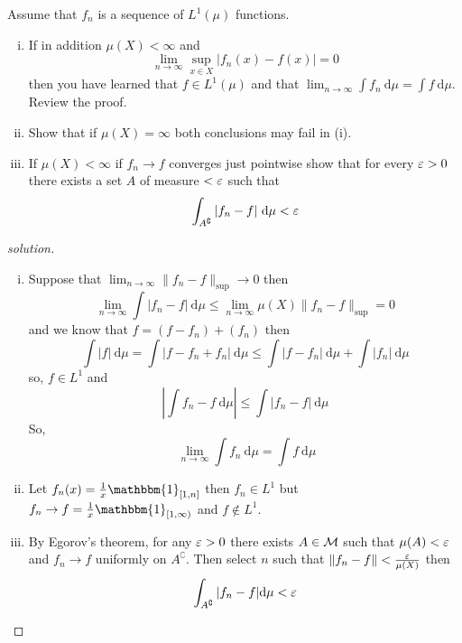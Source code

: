 \begin{problem}
  Assume that $f_n$ is a sequence of $L^1(\mu)$ functions.
  \begin{enumerate}[(i)]
    \item If in addition $\mu(X) < \infty$ and 
    \[\lim_{n\to\infty}\sup_{x \in X} |f_n(x) - f(x)| = 0\]
    then you have learned that $f \in L^1(\mu)$ and that $\lim_{n\to\infty}\int f_n \ \mathrm{d}\mu = \int f\ \mathrm{d}\mu$.
    Review the proof.
    \item Show that if $\mu(X) = \infty$ both conclusions may fail in (i).
    \item If $\mu(X) < \infty$ if $f_n \to f$ converges just pointwise show that for every $\varepsilon > 0$
    there exists a set $A$ of measure $< \varepsilon$ such that 
    \[\int_{A^\complement} |f_n - f| \ \mathrm{d}\mu < \varepsilon\]
  \end{enumerate}
\end{problem}
\begin{proof}[solution]
  \begin{enumerate}[(i)]
    \item Suppose that $\lim_{n\to\infty} \|f_n - f\|_{\sup} \to 0$ then 
    \[\lim_{n\to\infty}\int |f_n - f| \ \mathrm{d}\mu \le \lim_{n\to\infty}\mu(X)\|f_n - f\|_{\sup} = 0\]
    and we know that $f = (f - f_n) + (f_n)$ then
    \[\int |f| \ \mathrm{d}\mu = \int |f - f_n + f_n| \ \mathrm{d}\mu \le \int |f - f_n| \ \mathrm{d}\mu + \int |f_n| \ \mathrm{d}\mu\]
    so, $f \in L^1$ and 
    \[\left| \int f_n - f \ \mathrm{d}\mu\right|\le \int |f_n - f| \ \mathrm{d}\mu\]
    So, 
    \[\ \lim_{n\to\infty}\int f_n\ \mathrm{d}\mu = \int f \ \mathrm{d}\mu\]
    \item Let $f_n(x) = \frac1x\mathbbm{1}_{[1, n]}$ then $f_n \in L^1$ but $f_n \to f = \frac{1}x\mathbbm{1}_{[1, \infty)}$ and $f \not\in L^1$.
    \item By Egorov's theorem, for any $\varepsilon > 0$ there exists $A \in \mathcal M$ such that $\mu(A) < \varepsilon$ and $f_n \to f$ uniformly on $A^\complement$.
    Then select $n$ such that $\|f_n - f\| < \frac{\varepsilon}{\mu(X)}$ then
    \[\int_{A^\complement} |f_n - f| \mathrm{d}\mu < \varepsilon\]
  \end{enumerate}
\end{proof}

